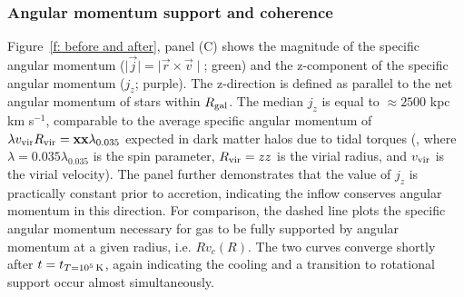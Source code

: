 \documentclass[fleqn,usenatbib]{mnras}
\newcommand{\tcon}{t_{T=10^5\,{\rm K}}}
\newcommand{\Rvir}{R_{\rm vir}}
\newcommand{\vvir}{v_{\rm vir}}
\begin{document}
\subsubsection{Angular momentum support and coherence}
\label{s: mechanics -- angular momentum}

Figure~\ref{f: before and after}, panel (C) shows the magnitude of the specific angular momentum ($\mid \vec j \mid = \mid \vec r \times \vec v \mid$; green) and the z-component of the specific angular momentum ($j_z$; purple).
The z-direction is defined as parallel to the net angular momentum of stars within $R_{\rm gal}$.
The median $j_z$ is equal to $\approx 2500$ kpc km s$^{-1}$, comparable to the average specific angular momentum of $\lambda \vvir \Rvir=\mathbf{xx}\lambda_{0.035}$ expected in dark matter halos due to tidal torques (\cite{Rodriguez2016}, where $\lambda = 0.035 \lambda_{0.035}$ is the spin parameter,  $\Rvir=zz$ is the virial radius, and $\vvir$ is the virial velocity).
The panel further demonstrates that the value of $j_z$ is practically constant prior to accretion, indicating the inflow conserves angular momentum in this direction.
For comparison, the dashed line plots the specific angular momentum necessary for gas to be fully supported by angular momentum at a given radius, i.e. $Rv_c(R)$.
The two curves converge shortly after $t=\tcon$, again indicating the cooling and a transition to rotational support occur almost simultaneously. 
\end{document}
